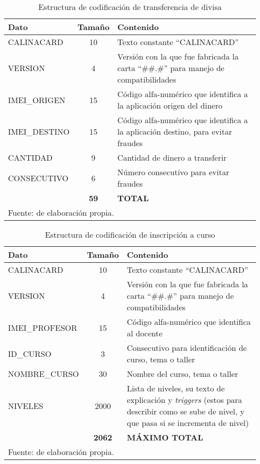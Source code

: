 \begin{table}[!htb]
\caption{Estructura de codificación de transferencia de divisa}
\label{tab:codificaciontransdivisa}
\begin{center}
\footnotesize
\begin{tabular}{ p{40mm} c p{100mm}}
\toprule
\textbf{Dato} & \textbf{Tamaño} & \textbf{Contenido}\\ 
\midrule
CALINACARD & 10 & Texto constante ``CALINACARD''\\
\midrule
VERSION & 4 & Versión con la que fue fabricada la carta ``\#\#.\#'' para manejo de compatibilidades\\
\midrule
IMEI\_ORIGEN & 15 & Código alfa-numérico que identifica a la aplicación origen del dinero\\
\midrule
IMEI\_DESTINO & 15 & Código alfa-numérico que identifica a la aplicación destino, para evitar fraudes\\
\midrule
CANTIDAD & 9 & Cantidad de dinero a transferir\\
\midrule
CONSECUTIVO & 6 & Número consecutivo para evitar fraudes\\
\bottomrule
& \textbf{59} & \textbf{TOTAL}\\
\bottomrule
\multicolumn{3}{l}{\footnotesize Fuente: de elaboración propia.}\\
\end{tabular}
\end{center}
\end{table}

\begin{table}[!htb]
\caption{Estructura de codificación de inscripción a curso}
\label{tab:codificacioninscripcioncurso}
\begin{center}
\footnotesize
\begin{tabular}{ p{40mm} c p{100mm}}
\toprule
\textbf{Dato} & \textbf{Tamaño} & \textbf{Contenido}\\ 
\midrule
CALINACARD & 10 & Texto constante ``CALINACARD''\\
\midrule
VERSION & 4 & Versión con la que fue fabricada la carta ``\#\#.\#'' para manejo de compatibilidades\\
\midrule
IMEI\_PROFESOR & 15 & Código alfa-numérico que identifica al docente\\
\midrule
ID\_CURSO & 3 & Consecutivo para identificación de curso, tema o taller\\
\midrule
NOMBRE\_CURSO & 30 & Nombre del curso, tema o taller\\
\midrule
NIVELES & 2000 & Lista de niveles, su texto de explicación y \textit{triggers} (estos para describir como se
sube de nivel, y que pasa si se incrementa de nivel)\\
\bottomrule
& \textbf{2062} & \textbf{MÁXIMO TOTAL}\\
\bottomrule
\multicolumn{3}{l}{\footnotesize Fuente: de elaboración propia.}\\
\end{tabular}
\end{center}
\end{table}

